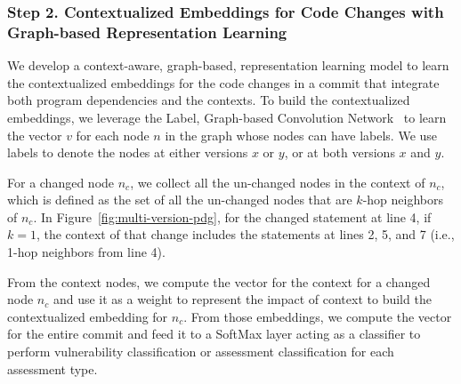 




\vspace{2pt}
\subsubsection*{{\bf Step 2. Contextualized Embeddings for Code Changes with
Graph-based Representation Learning}} We develop a context-aware,
graph-based, representation learning model to learn the contextualized
embeddings for the code changes in a commit that integrate both
program dependencies and the contexts. To build the contextualized
embeddings, we leverage the Label, Graph-based Convolution
Network~\cite{label-gcn} to learn the vector $v$ for each node $n$ in
the graph whose nodes can have labels. We use labels to denote the
nodes at either versions $x$ or $y$, or at both versions $x$ and $y$.

For a changed node $n_c$, we collect all the un-changed nodes in the
context of $n_c$, which is defined as the set of all the un-changed
nodes that are $k$-hop neighbors of $n_c$. In
Figure~\ref{fig:multi-version-pdg}, for the changed statement at line
4, if $k=1$, the context of that change includes the statements at
lines 2, 5, and 7 (i.e., 1-hop neighbors from line 4).

From the context nodes, we compute the vector for the context
for a changed node $n_c$ and use it as a weight to represent the
impact of context to build the contextualized embedding for $n_c$.
From those embeddings, we compute the vector for the entire
commit and feed it to a SoftMax layer acting as
a classifier to perform vulnerability classification or assessment
classification for each assessment type.



